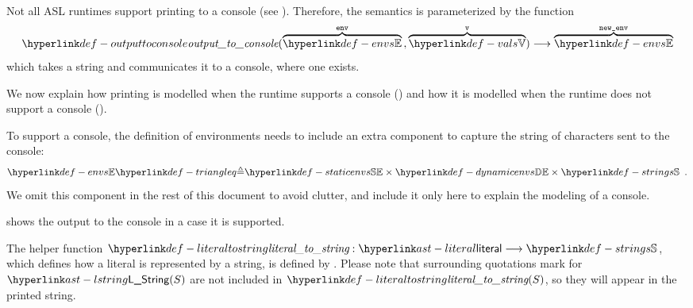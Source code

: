 Not all ASL runtimes support printing to a console (see ).
%
Therefore, the semantics is parameterized by the function
\hypertarget{def-outputtoconsole}{}
\[
\outputtoconsole(\overname{\envs}{\env} \aslsep \overname{\vals}{\vv}) \aslto
  \overname{\envs}{\newenv}
\]
which takes a string and communicates it to a console, where one exists.

We now explain how printing is modelled when the runtime supports a console
()
and how it is modelled when the runtime does not support a console
().

To support a console, the definition of environments needs
to include an extra component to capture the string of characters sent to the console:
\[
\envs \triangleq \staticenvs \times \dynamicenvs \times \Strings \enspace.
\]
We omit this component in the rest of this document to avoid clutter, and include it
only here to explain the modeling of a console.

 shows the output to the console in a case it is supported.

\hypertarget{def-literaltostring}{}
The helper function $\literaltostring : \literal \aslto \Strings$,
which defines how a literal is represented by a string,
is defined by .
%
Please note that surrounding quotations mark for $\lstring(S)$ are not included
in $\literaltostring(S)$, so they will appear in the printed string.


